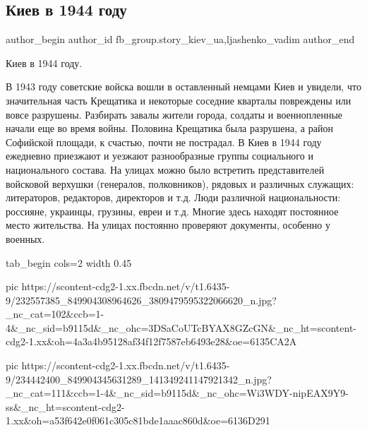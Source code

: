  
 
 
 
 
 
\subsection{Киев в 1944 году}
\label{sec:07_08_2021.fb.fb_group.story_kiev_ua.1.kiev_1944}
 
\ifcmt
 author_begin
   author_id fb_group.story_kiev_ua,ljashenko_vadim
 author_end
\fi

Киев в 1944 году.

В 1943 году советские войска вошли в оставленный немцами Киев и увидели, что
значительная часть Крещатика и некоторые соседние кварталы повреждены или вовсе
разрушены. Разбирать завалы жители города, солдаты и военнопленные начали еще
во время войны. Половина Крещатика была разрушена, а район Софийской площади, к
счастью, почти не пострадал. В Киев в 1944 году ежедневно приезжают и уезжают
разнообразные группы социального и национального состава. На улицах можно было
встретить представителей войсковой верхушки (генералов, полковников), рядовых и
различных служащих: литераторов, редакторов, директоров и т.д. Люди различной
национальности: россияне, украинцы, грузины, евреи и т.д. Многие здесь находят
постоянное место жительства. На улицах постоянно проверяют документы, особенно
у военных. 

\ifcmt
  tab_begin cols=2
		width 0.45

     pic https://scontent-cdg2-1.xx.fbcdn.net/v/t1.6435-9/232557385_849904308964626_3809479595322066620_n.jpg?_nc_cat=102&ccb=1-4&_nc_sid=b9115d&_nc_ohc=3DSaCoUTcBYAX8GZcGN&_nc_ht=scontent-cdg2-1.xx&oh=4a3a4b95128af34f12f7587eb6493e28&oe=6135CA2A

     pic https://scontent-cdg2-1.xx.fbcdn.net/v/t1.6435-9/234442400_849904345631289_141349241147921342_n.jpg?_nc_cat=111&ccb=1-4&_nc_sid=b9115d&_nc_ohc=Wi3WDY-nipEAX9Y9-ss&_nc_ht=scontent-cdg2-1.xx&oh=a53f642e0f061c305c81bde1aaac860d&oe=6136D291

